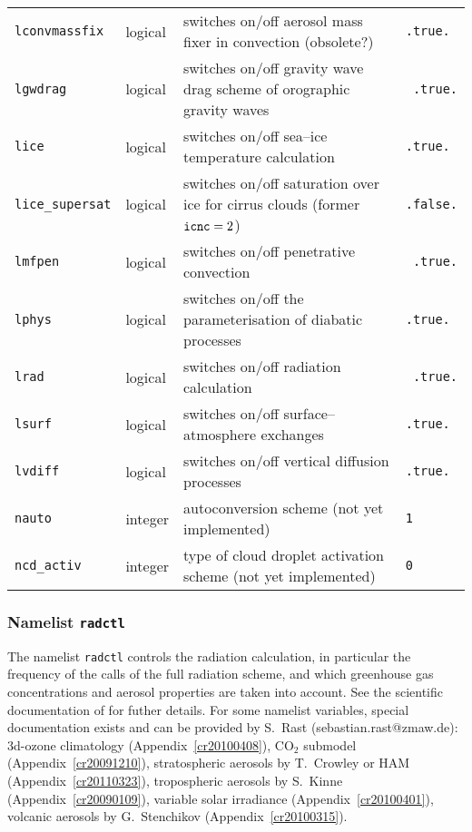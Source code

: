 \begin{longtable}{l@{\extracolsep\fill}lp{7cm}p{3.5cm}}
{\tt lconvmassfix}\index{namelist variables!lconvmassfix}
 & logical & switches on/off aerosol mass fixer in
  convection (obsolete?) & {\tt .true.} \\
{\tt lgwdrag}\index{namelist variables!lgwdrag}
 & logical  &   switches on/off gravity wave drag scheme of orographic
 gravity waves & {\tt
  .true.} \\  
{\tt lice}\index{namelist variables!lice} 
 &    logical  &   switches on/off sea--ice temperature calculation &
  {\tt .true.} \\
{\tt lice\_supersat}\index{namelist variables!lice\_supersat}
 & logical & switches on/off saturation over ice
for cirrus clouds (former ${\tt icnc} = 2$) & {\tt .false.} \\
{\tt lmfpen}\index{namelist variables!lmfpen}
 &  logical  &   switches on/off penetrative convection & {\tt
  .true.} \\
{\tt lphys}\index{namelist variables!lphys}
 &   logical &   switches on/off the parameterisation of
  diabatic processes   & {\tt .true.} \\
{\tt lrad}\index{namelist variables!lrad}
 &     logical &   switches on/off radiation calculation & {\tt
  .true.} \\
{\tt lsurf}\index{namelist variables!lsurf}
 &   logical  &   switches on/off surface--atmosphere exchanges &
  {\tt .true.}\\
{\tt lvdiff}\index{namelist variables!lvdiff}
 &   logical &   switches on/off vertical diffusion processes &
  {\tt .true.} \\
{\tt nauto}\index{namelist variables!nauto}
 &integer&  autoconversion scheme (not yet implemented) &
{\tt 1} \\
{\tt ncd\_activ}\index{namelist variables!ncd\_activ}
 & integer & type of cloud droplet activation scheme
(not yet implemented) & {\tt 0} \\
\hline
\end{longtable}



\subsubsection{Namelist {\tt radctl}}

The namelist {\tt radctl} controls the radiation calculation, in
particular the frequency of the calls of the full radiation scheme,
and which greenhouse gas concentrations and aerosol properties are
taken into account. See the scientific documentation of \echam{} for
futher details. For some namelist variables, special documentation
exists and can be provided by S.~Rast (sebastian.rast@zmaw.de):
3d-ozone climatology (Appendix~\ref{cr20100408}), CO$_2$ submodel 
(Appendix~\ref{cr20091210}), 
stratospheric aerosols by T.~Crowley or HAM
(Appendix~\ref{cr20110323}), 
tropospheric aerosols by S.~Kinne
(Appendix~\ref{cr20090109}),
variable solar irradiance (Appendix~\ref{cr20100401}), volcanic aerosols by
G.~Stenchikov (Appendix~\ref{cr20100315}).


